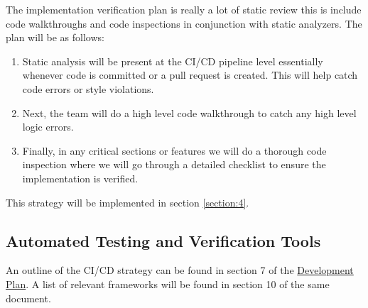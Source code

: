 \documentclass[12pt, titlepage]{article}
\begin{document}

The implementation verification plan is really a lot of static review this is include code walkthroughs and code inspections in conjunction with static analyzers. The plan will be as follows:

\begin{enumerate}
  \item Static analysis will be present at the CI/CD pipeline level essentially whenever code is committed or a pull request is created. This will help catch code errors or style violations.
  \item Next, the team will do a high level code walkthrough to catch any high level logic errors.
  \item Finally, in any critical sections or features we will do a thorough code inspection where we will go through a detailed checklist to ensure the implementation is verified.
\end{enumerate}

This strategy will be implemented in section \ref{section:4}.

\subsection{Automated Testing and Verification Tools}




An outline of the CI/CD strategy can be found in section 7 of the \href{https://github.com/Inreet-Kaur/capstone/blob/main/docs/DevelopmentPlan/DevelopmentPlan.pdf}{Development Plan}. A list of relevant frameworks will be found in section 10 of the same document.
\end{document}
